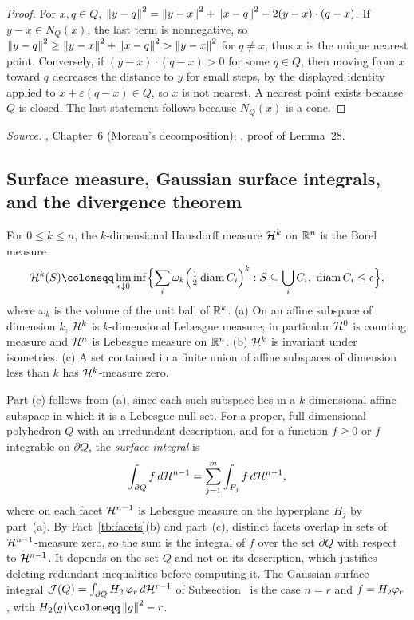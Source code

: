 \begin{proof}
For \(x,q\in Q\), \(\left\lVert y-q\right\rVert^2=\left\lVert y-x\right\rVert^2+\left\lVert x-q\right\rVert^2-2(y-x)\cdot(q-x)\).
If \(y-x\in N_Q(x)\), the last term is nonnegative, so
\(\left\lVert y-q\right\rVert^2\ge\left\lVert y-x\right\rVert^2+\left\lVert x-q\right\rVert^2>\left\lVert y-x\right\rVert^2\) for \(q\ne x\); thus
\(x\) is the unique nearest point. Conversely, if \((y-x)\cdot(q-x)>0\) for
some \(q\in Q\), then moving from \(x\) toward \(q\) decreases the distance
to \(y\) for small steps, by the displayed identity applied to
\(x+\varepsilon(q-x)\in Q\), so \(x\) is not nearest. A nearest point exists
because \(Q\) is closed. The last statement follows because \(N_Q(x)\) is a
cone.
\end{proof}

\emph{Source.} , Chapter~6 (Moreau's decomposition); ,
proof of Lemma~28.

\subsection{Surface measure, Gaussian surface integrals, and the
divergence theorem}\label{tb:sec:surface}

\begin{fact}\label{tb:hausdorff}
For \(0\le k\le n\), the \(k\)-dimensional Hausdorff measure \(\mathcal H^k\) on
\(\mathbb R^n\) is the Borel measure
\[
 \Haus^k(S)\coloneqq \lim_{\epsilon\downarrow0}\inf\Bigl\{\sum_i\omega_k
 \Bigl(\tfrac12\operatorname{diam}C_i\Bigr)^k:S\subseteq\bigcup_iC_i,\
 \operatorname{diam}C_i\le\epsilon\Bigr\},
\]
where \(\omega_k\) is the volume of the unit ball of \(\mathbb R^k\). (a) On an
affine subspace of dimension \(k\), \(\mathcal H^k\) is \(k\)-dimensional Lebesgue
measure; in particular \(\mathcal H^0\) is counting measure and \(\mathcal H^n\) is
Lebesgue measure on \(\mathbb R^n\). (b) \(\mathcal H^k\) is invariant under isometries.
(c) A set contained in a finite union of affine subspaces of dimension less
than \(k\) has \(\mathcal H^k\)-measure zero.
\end{fact}

Part (c) follows from (a), since each such subspace lies in a
\(k\)-dimensional affine subspace in which it is a Lebesgue null set. For a
proper, full-dimensional polyhedron \(Q\) with an irredundant description,
and for a function \(f\ge0\) or \(f\) integrable on \(\partial Q\), the
\emph{surface integral} is
\[
 \int_{\partial Q}f\,d\mathcal H^{n-1}=\sum_{j=1}^m\int_{F_j}f\,d\mathcal H^{n-1},
\]
where on each facet \(\mathcal H^{n-1}\) is Lebesgue measure on the hyperplane
\(H_j\) by part~(a). By Fact~\ref{tb:facets}(b) and part~(c), distinct
facets overlap in sets of \(\mathcal H^{n-1}\)-measure zero, so the sum is the
integral of \(f\) over the set \(\partial Q\) with respect to
\(\mathcal H^{n-1}\). It depends on the set \(Q\) and not on its description,
which justifies deleting redundant inequalities before computing it.
The Gaussian surface integral \(\mathcal J(Q)=\int_{\partial Q}H_2\,\varphi_r\,
d\mathcal H^{r-1}\) of Subsection~\PN{sec:outline-late}{2.4} is the case
\(n=r\) and \(f=H_2\varphi_r\), with \(\Hh(g)\coloneqq \norm g^2-r\).

